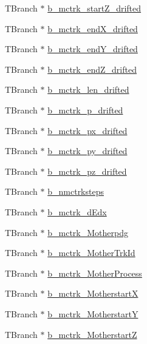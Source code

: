 \begin{DoxyCompactItemize}
\item 
T\-Branch $\ast$ \hyperlink{classanatree_a861718f52eb8d211359232fa5f7e9eb9}{b\-\_\-mctrk\-\_\-start\-Z\-\_\-drifted}
\item 
T\-Branch $\ast$ \hyperlink{classanatree_a04228625a794fd62d1cb36a4f1c11d0a}{b\-\_\-mctrk\-\_\-end\-X\-\_\-drifted}
\item 
T\-Branch $\ast$ \hyperlink{classanatree_a8dd7b58254f69ea9451197ddba3c4b60}{b\-\_\-mctrk\-\_\-end\-Y\-\_\-drifted}
\item 
T\-Branch $\ast$ \hyperlink{classanatree_abcaf0bbfbd71ed2440d10ee32dac04fb}{b\-\_\-mctrk\-\_\-end\-Z\-\_\-drifted}
\item 
T\-Branch $\ast$ \hyperlink{classanatree_af2ad6142ab028bde107c9fda85406372}{b\-\_\-mctrk\-\_\-len\-\_\-drifted}
\item 
T\-Branch $\ast$ \hyperlink{classanatree_ae5c1ae98ba04468999a94eb298a9a1ee}{b\-\_\-mctrk\-\_\-p\-\_\-drifted}
\item 
T\-Branch $\ast$ \hyperlink{classanatree_ab1597bfc7c8389540e59bafdaf6f26bc}{b\-\_\-mctrk\-\_\-px\-\_\-drifted}
\item 
T\-Branch $\ast$ \hyperlink{classanatree_a7aa4289ad7f470d430c481a716d3c2d5}{b\-\_\-mctrk\-\_\-py\-\_\-drifted}
\item 
T\-Branch $\ast$ \hyperlink{classanatree_ad7873c06a1a3dd57bba52173d47842d2}{b\-\_\-mctrk\-\_\-pz\-\_\-drifted}
\item 
T\-Branch $\ast$ \hyperlink{classanatree_ad8f989bb433d5ae95280293af6c95a6e}{b\-\_\-nmctrksteps}
\item 
T\-Branch $\ast$ \hyperlink{classanatree_a294073dd1048a78609b48052fe6e12d7}{b\-\_\-mctrk\-\_\-d\-Edx}
\item 
T\-Branch $\ast$ \hyperlink{classanatree_ac7df5b9ebb276a32a740260201c1e832}{b\-\_\-mctrk\-\_\-\-Motherpdg}
\item 
T\-Branch $\ast$ \hyperlink{classanatree_a358b146660efe52d40d506c53befc129}{b\-\_\-mctrk\-\_\-\-Mother\-Trk\-Id}
\item 
T\-Branch $\ast$ \hyperlink{classanatree_ac732d7a306c0844a6c130642cd7c2bb7}{b\-\_\-mctrk\-\_\-\-Mother\-Process}
\item 
T\-Branch $\ast$ \hyperlink{classanatree_a3974cadd7897b8fcc85a7af0d10a6195}{b\-\_\-mctrk\-\_\-\-Motherstart\-X}
\item 
T\-Branch $\ast$ \hyperlink{classanatree_a6e419ac1d91409f896959414b84713c5}{b\-\_\-mctrk\-\_\-\-Motherstart\-Y}
\item 
T\-Branch $\ast$ \hyperlink{classanatree_a118e731906061370dbcadee3789738b9}{b\-\_\-mctrk\-\_\-\-Motherstart\-Z}

\end{DoxyCompactItemize}
